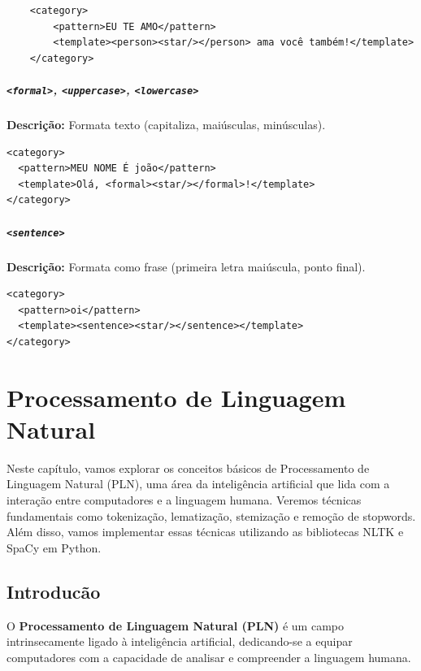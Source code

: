 \documentclass[14pt,a4paper,oneside]{book}
\begin{document}
\begin{lstlisting}
	<category>
		<pattern>EU TE AMO</pattern>
		<template><person><star/></person> ama você também!</template>
	</category>
\end{lstlisting}

\paragraph{\texttt{<formal>}, \texttt{<uppercase>}, \texttt{<lowercase>}} 

\textbf{Descrição:} Formata texto (capitaliza, maiúsculas, minúsculas). 

\begin{lstlisting}
<category>
  <pattern>MEU NOME É joão</pattern>
  <template>Olá, <formal><star/></formal>!</template>
</category>
\end{lstlisting}

\paragraph{\texttt{<sentence>}} 

\textbf{Descrição:} Formata como frase (primeira letra maiúscula, ponto final). 

\begin{lstlisting}
<category>
  <pattern>oi</pattern>
  <template><sentence><star/></sentence></template>
</category>
\end{lstlisting}


\chapter{Processamento de Linguagem Natural}

Neste capítulo, vamos explorar os conceitos básicos de Processamento de Linguagem Natural (PLN), uma área da inteligência artificial que lida com a interação entre computadores e a linguagem humana. Veremos técnicas fundamentais como tokenização, lematização, stemização e remoção de stopwords. Além disso, vamos implementar essas técnicas utilizando as bibliotecas NLTK e SpaCy em Python.

\section{Introducão}

O \textbf{Processamento de Linguagem Natural (PLN)} é um campo intrinsecamente ligado à inteligência artificial, dedicando-se a equipar computadores com a capacidade de analisar e compreender a linguagem humana. 
\end{document}
